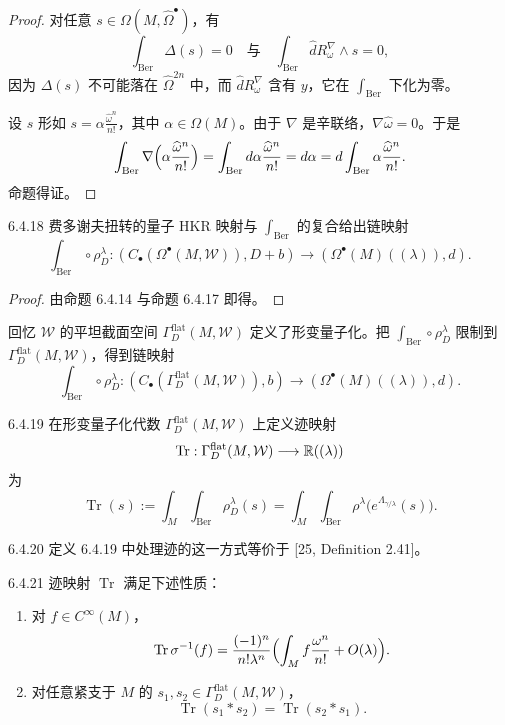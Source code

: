\begin{proof}
  对任意 $s\in\Omega(M,\widehat\Omega^\bullet)$，有
  \[
  \int_{\mathrm{Ber}}\Delta(s)=0
  \quad\text{与}\quad
  \int_{\mathrm{Ber}}\widehat dR_\omega^\nabla\wedge s=0,
  \]
  因为 $\Delta(s)$ 不可能落在 $\widehat\Omega^{2n}$ 中，而 $\widehat dR_\omega^\nabla$ 含有 $y$，它在 $\int_{\mathrm{Ber}}$ 下化为零。

  设 $s$ 形如 $s=\alpha\frac{\widehat\omega^n}{n!}$，其中 $\alpha\in\Omega(M)$。由于 $\nabla$ 是辛联络，$\nabla\widehat\omega=0$。于是
  \[
  \int_{\mathrm{Ber}}\nabla\Bigl(\alpha\frac{\widehat\omega^n}{n!}\Bigr)
  =\int_{\mathrm{Ber}}d\alpha\frac{\widehat\omega^n}{n!}
  =d\alpha
  =d\int_{\mathrm{Ber}}\alpha\frac{\widehat\omega^n}{n!}.
  \]
  命题得证。
\end{proof}

\begin{proposition}{6.4.18}
  费多谢夫扭转的量子 HKR 映射与 $\int_{\mathrm{Ber}}$ 的复合给出链映射
  \[
  \int_{\mathrm{Ber}}\circ\rho_D^\lambda:
  (C_\bullet(\Omega^\bullet(M,\mathcal W)),D+b)
  \longrightarrow(\Omega^\bullet(M)((\lambda)),d).
  \]
\end{proposition}

\begin{proof}
  由命题 6.4.14 与命题 6.4.17 即得。
\end{proof}

回忆 $\mathcal W$ 的平坦截面空间 $\Gamma^{\mathrm{flat}}_D(M,\mathcal W)$ 定义了形变量子化。把 $\int_{\mathrm{Ber}}\circ\rho_D^\lambda$ 限制到 $\Gamma^{\mathrm{flat}}_D(M,\mathcal W)$，得到链映射
\[
\int_{\mathrm{Ber}}\circ\rho_D^\lambda:
(C_\bullet(\Gamma^{\mathrm{flat}}_D(M,\mathcal W)),b)
\longrightarrow(\Omega^\bullet(M)((\lambda)),d).
\]

\begin{definition}{6.4.19}
  在形变量子化代数 $\Gamma^{\mathrm{flat}}_D(M,\mathcal W)$ 上定义迹映射
  \[
  \operatorname{Tr}:\Gamma^{\mathrm{flat}}_D(M,\mathcal W)
  \longrightarrow\mathbb{R}((\lambda))
  \]
  为
  \[
  \operatorname{Tr}(s):=\int_M\int_{\mathrm{Ber}}\rho_D^\lambda(s)
  =\int_M\int_{\mathrm{Ber}}\rho^\lambda\bigl(e^{\Lambda_{\gamma/\lambda}}(s)\bigr).
  \]
\end{definition}

\begin{remark}{6.4.20}
  定义 6.4.19 中处理迹的这一方式等价于 [25, Definition 2.41]。
\end{remark}

\begin{theorem}{6.4.21}
  迹映射 $\operatorname{Tr}$ 满足下述性质：

  \begin{enumerate}[label=(\arabic*),leftmargin=3.2em,itemsep=2pt]
  \item 对 $f\in C^\infty(M)$，
  \[
  \operatorname{Tr}\sigma^{-1}(f)
  =\frac{(-1)^n}{n!\lambda^n}
  \Bigl(\int_Mf\frac{\omega^n}{n!}+O(\lambda)\Bigr).
  \]
  \item 对任意紧支于 $M$ 的 $s_1,s_2\in\Gamma^{\mathrm{flat}}_D(M,\mathcal W)$，
  \[
  \operatorname{Tr}(s_1\ast s_2)=\operatorname{Tr}(s_2\ast s_1).
  \]
  \end{enumerate}
\end{theorem}

